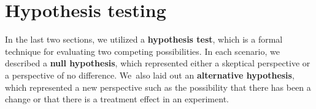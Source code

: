 







%
%
%
%





\section{Hypothesis testing}
\label{HypothesisTesting}

In the last two sections, we utilized a \textbf{hypothesis test}, which is a formal technique for evaluating two competing possibilities. In each scenario, we described a \textbf{null hypothesis}, which represented either a skeptical perspective or a perspective of no difference. We~also laid out an \textbf{alternative hypothesis}, which represented a new perspective such as the possibility that there has been a change or that there is a treatment effect in an experiment.

